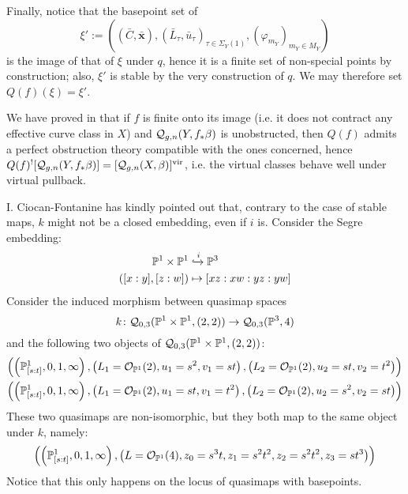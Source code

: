 Finally, notice that the basepoint set of \[\xi':=\left((\bar C,\bar{\mathbf x}),(\bar L_\tau,\bar u_\tau)_{\tau\in\Sigma_Y(1)},(\varphi_{m_Y})_{m_Y\in M_Y}\right)\] is the image of that of $\xi$ under $q$, hence it is a finite set of non-special points by construction; also, $\xi'$ is stable by the very construction of $q$. We may therefore set $Q(f)(\xi)=\xi'$.

\begin{rmk} We have proved in \cite[Lemma B.5]{BN} that if $f$ is finite onto its image (i.e. it does not contract any effective curve class in $X$) and $\mathcal{Q}_{g,n}(Y,f_*\beta)$ is unobstructed, then $Q(f)$ admits a perfect obstruction theory compatible with the ones concerned, hence $Q(f)^![\mathcal{Q}_{g,n}(Y,f_*\beta)]=[\mathcal{Q}_{g,n}(X,\beta)]^{\mathrm{vir}}$, i.e. the virtual classes behave well under virtual pullback. \end{rmk}

\begin{rmk}
I. Ciocan-Fontanine has kindly pointed out that, contrary to the case of stable maps, $k$ might not be a closed embedding, even if $i$ is. Consider the Segre embedding:
\begin{align*}
\mathbb P^1\times\mathbb P^1 & \xhookrightarrow{i} \mathbb P^3\\ 
([x:y],[z:w]) & \mapsto [xz:xw:yz:yw]\end{align*}
Consider the induced morphism between quasimap spaces
\begin{equation*} k\colon \mathcal{Q}_{0,3}(\mathbb P^1\times\mathbb P^1,(2,2))\rightarrow\mathcal{Q}_{0,3}(\mathbb P^3,4) \end{equation*}
and the following two objects of $\mathcal{Q}_{0,3}(\mathbb P^1 \times \mathbb P^1,(2,2))$:
\begin{align*}
  \left(\left(\mathbb P^1_{[s:t]},0,1,\infty\right),\left(L_1=\mathcal{O}_{\mathbb P^1}(2),u_1=s^2 ,v_1=st\right),\left(L_2=\mathcal{O}_{\mathbb P^1}(2), u_2=st,v_2=t^2\right)\right)\\
  \left(\left(\mathbb P^1_{[s:t]},0,1,\infty\right),\left(L_1=\mathcal{O}_{\mathbb P^1}(2),u_1=st ,v_1=t^2 \right),\left(L_2=\mathcal{O}_{\mathbb P^1}(2), u_2=s^2,v_2=st\right)\right)
\end{align*}
These two quasimaps are non-isomorphic, but they both map to the same object under $k$, namely:
 \[
   \left(\left(\mathbb P^1_{[s:t]},0,1,\infty\right),\left(L=\mathcal{O}_{\mathbb P^1}(4),z_0=s^3t,z_1=s^2t^2,z_2=s^2t^2,z_3=st^3\right)\right)
 \]
Notice that this only happens on the locus of quasimaps with basepoints.
 \end{rmk}
